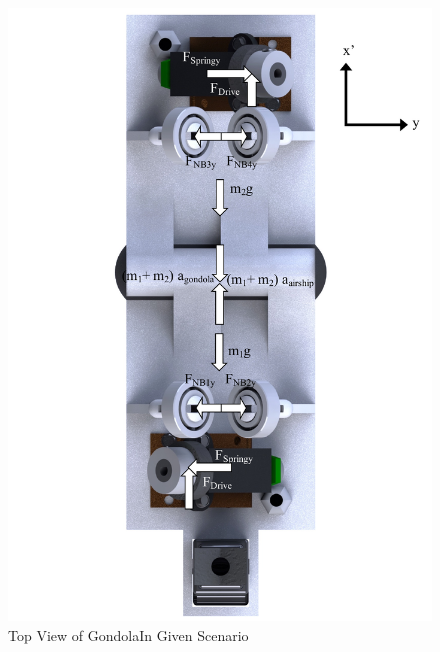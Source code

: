 \documentclass[../main.tex]{subfiles}
\begin{document}
\begin{figure}[H]
	\centering
	\includegraphics[width=1\textwidth]{img/gondola/gondolaTopTW.pdf}
	\caption{Top View of GondolaIn Given Scenario}
	\label{fig:gondolaTopTW}
\end{figure}
\end{document}
